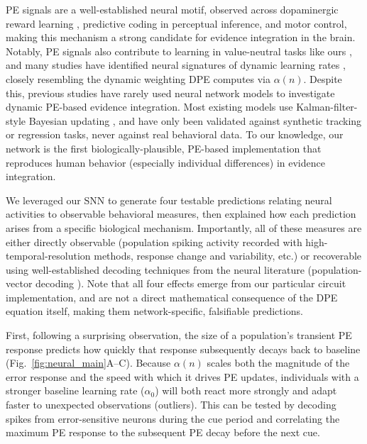 \documentclass[12pt]{article}
\begin{document}
PE signals are a well-established neural motif, observed across dopaminergic reward learning \cite{glimcher2011understanding}, predictive coding in perceptual inference, and motor control, making this mechanism a strong candidate for evidence integration in the brain. Notably, PE signals also contribute to learning in value-neutral tasks like ours \cite{costa2025striatal}, and many studies have identified neural signatures of dynamic learning rates \cite{doll2011dopaminergic, schmidt2014mind, farashahi2017metaplasticity}, closely resembling the dynamic weighting DPE computes via $\alpha(n)$. Despite this, previous studies have rarely used neural network models to investigate dynamic PE-based evidence integration. Most existing models use Kalman-filter-style Bayesian updating \cite{millidge2021neural, adamiat2025spiking}, and have only been validated against synthetic tracking or regression tasks, never against real behavioral data. To our knowledge, our network is the first biologically-plausible, PE-based implementation that reproduces human behavior (especially individual differences) in evidence integration.

We leveraged our SNN to generate four testable predictions relating neural activities to observable behavioral measures, then explained how each prediction arises from a specific biological mechanism. Importantly, all of these measures are either directly observable (population spiking activity recorded with high-temporal-resolution methods, response change and variability, etc.) or recoverable using well-established decoding techniques from the neural literature (population-vector decoding \cite{georgopoulos1986neuronal, wu2006bayesian}). Note that all four effects emerge from our particular circuit implementation, and are not a direct mathematical consequence of the DPE equation itself, making them network-specific, falsifiable predictions.

First, following a surprising observation, the size of a population's transient PE response predicts how quickly that response subsequently decays back to baseline (Fig.~\ref{fig:neural_main}A--C). Because $\alpha(n)$ scales both the magnitude of the error response and the speed with which it drives PE updates, individuals with a stronger baseline learning rate ($\alpha_0$) will both react more strongly and adapt faster to unexpected observations (outliers). This can be tested by decoding spikes from error-sensitive neurons during the cue period and correlating the maximum PE response to the subsequent PE decay before the next cue.
\end{document}
